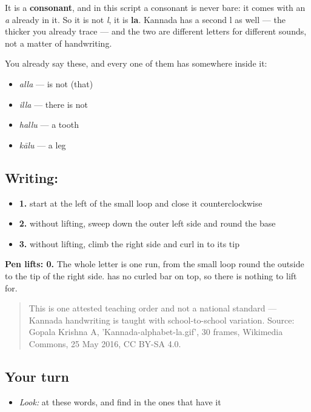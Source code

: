 It is a \textbf{consonant}, and in this script a consonant is never bare: it comes with an \emph{a} already in it. So it is not \emph{l}, it is \textbf{la}. Kannada has a second l as well — the thicker  you already trace — and the two are different letters for different sounds, not a matter of handwriting.

You already say these, and every one of them has  somewhere inside it:

\begin{itemize}
\raggedright
  \item \textbf{} \emph{alla} — is not (that)
  \item \textbf{} \emph{illa} — there is not
  \item \textbf{} \emph{hallu} — a tooth
  \item \textbf{} \emph{kālu} — a leg
\end{itemize}

\subsection*{Writing: }

\begin{itemize}
\raggedright
  \item \textbf{1.} start at the left of the small loop and close it counterclockwise
  \item \textbf{2.} without lifting, sweep down the outer left side and round the base
  \item \textbf{3.} without lifting, climb the right side and curl in to its tip
\end{itemize}

\textbf{Pen lifts: 0.} The whole letter is one run, from the small loop round the outside to the tip of the right side.  has no curled bar on top, so there is nothing to lift for.

\begin{quote}
This is one attested teaching order and not a national standard — Kannada handwriting is taught with school-to-school variation. Source: Gopala Krishna A, 'Kannada-alphabet-la.gif', 30 frames, Wikimedia Commons, 25 May 2016, CC BY-SA 4.0.
\end{quote}

\subsection*{Your turn}
\begin{itemize}
\raggedright
  \item \emph{Look:} at these words, and find  in the ones that have it
\end{itemize}

